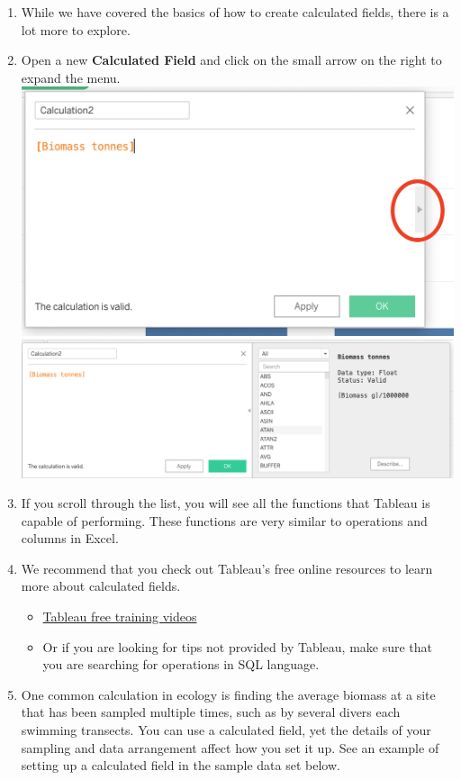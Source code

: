 \documentclass[
]{book}
\providecommand{\tightlist}{%
  \setlength{\itemsep}{0pt}\setlength{\parskip}{0pt}}
\begin{document}
\begin{enumerate}
\def\labelenumi{\arabic{enumi}.}
\tightlist
\item
  While we have covered the basics of how to create calculated fields, there is a lot more to explore.
\item
  Open a new \textbf{Calculated Field} and click on the small arrow on the right to expand the menu.
  \includegraphics{images/m3s4_open-functions.png}
  \includegraphics{images/m3s4_view-functions.png}
\item
  If you scroll through the list, you will see all the functions that Tableau is capable of performing. These functions are very similar to operations and columns in Excel.
\item
  We recommend that you check out Tableau's free online resources to learn more about calculated fields.

  \begin{itemize}
  \tightlist
  \item
    \href{https://www.tableau.com/learn/training/20212}{Tableau free training videos}
  \item
    Or if you are looking for tips not provided by Tableau, make sure that you are searching for operations in SQL language.
  \end{itemize}
\item
  One common calculation in ecology is finding the average biomass at a site that has been sampled multiple times, such as by several divers each swimming transects. You can use a calculated field, yet the details of your sampling and data arrangement affect how you set it up. See an example of setting up a calculated field in the sample data set below.
\end{enumerate}
\end{document}
